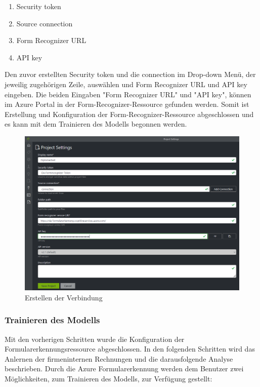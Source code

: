 \begin{enumerate}
    \item Security token
    \item Source connection
    \item Form Recognizer URL
    \item API key
\end{enumerate}

Den zuvor erstellten Security token und die connection im Drop-down Menü, der jeweilig zugehörigen Zeile, auswählen und Form Recognizer URL und API key eingeben.
Die beiden Eingaben "Form Recognizer URL" und "API key", können im Azure Portal in der Form-Recognizer-Ressource gefunden werden. Somit ist
Erstellung und Konfiguration der Form-Recognizer-Ressource abgeschlossen und es kann mit dem Trainieren des Modells begonnen werden.

\begin{figure}[h]
    \centering
    \includegraphics[scale=0.5]{sections/cloud-computing/images/formrecognizer-new-project.PNG}
    \caption{Erstellen der Verbindung}
    \label{fig:formrecognizer-security-token}
\end{figure}

\subsubsection{Trainieren des Modells}

Mit den vorherigen Schritten wurde die Konfiguration der Formularerkennungsressource abgeschlossen. In den folgenden Schritten wird das
Anlernen der firmeninternen Rechnungen und die darausfolgende Analyse beschrieben.
Durch die Azure Formularerkennung werden dem Benutzer zwei Möglichkeiten, zum Trainieren des Modells, zur Verfügung gestellt:

